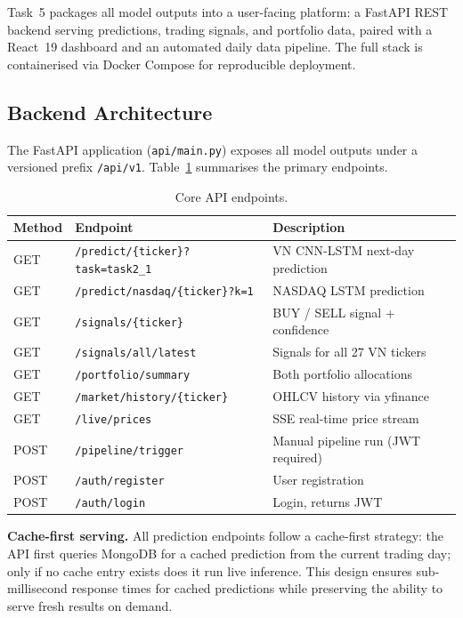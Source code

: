 \documentclass[12pt, a4paper]{article}
\begin{document}
Task~5 packages all model outputs into a user-facing platform:
a FastAPI REST backend serving predictions, trading signals, and
portfolio data, paired with a React~19 dashboard and an automated
daily data pipeline. The full stack is containerised via Docker
Compose for reproducible deployment.

\subsection{Backend Architecture}

The FastAPI application (\texttt{api/main.py}) exposes all model
outputs under a versioned prefix \texttt{/api/v1}.
Table~\ref{tab:api_endpoints} summarises the primary endpoints.

\begin{table}[h]
\centering
\caption{Core API endpoints.}
\label{tab:api_endpoints}
\renewcommand{\arraystretch}{1.3}
\small
\begin{tabular}{llp{5.5cm}}
\hline
\textbf{Method} & \textbf{Endpoint} & \textbf{Description} \\
\hline
GET & \texttt{/predict/\{ticker\}?task=task2\_1} & VN CNN-LSTM next-day prediction \\
GET & \texttt{/predict/nasdaq/\{ticker\}?k=1}    & NASDAQ LSTM prediction \\
GET & \texttt{/signals/\{ticker\}}               & BUY / SELL signal + confidence \\
GET & \texttt{/signals/all/latest}               & Signals for all 27 VN tickers \\
GET & \texttt{/portfolio/summary}                & Both portfolio allocations \\
GET & \texttt{/market/history/\{ticker\}}        & OHLCV history via yfinance \\
GET & \texttt{/live/prices}                      & SSE real-time price stream \\
POST & \texttt{/pipeline/trigger}               & Manual pipeline run (JWT required) \\
POST & \texttt{/auth/register}                  & User registration \\
POST & \texttt{/auth/login}                     & Login, returns JWT \\
\hline
\end{tabular}
\end{table}

\textbf{Cache-first serving.}
All prediction endpoints follow a cache-first strategy: the API
first queries MongoDB for a cached prediction from the current
trading day; only if no cache entry exists does it run live
inference. This design ensures sub-millisecond response times for
cached predictions while preserving the ability to serve fresh
results on demand.
\end{document}
